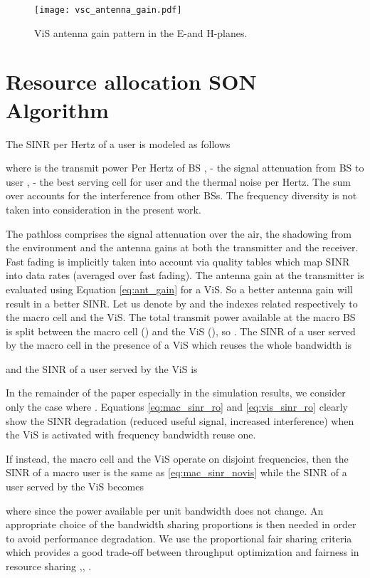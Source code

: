 \documentclass[conference]{IEEEtran}
\begin{document}
\begin{figure}[!ht]
\centering
\texttt{[image: vsc\_antenna\_gain.pdf]}
\caption{\ac{ViS} antenna gain pattern in the E-and H-planes.}
\label{fig:ant_gain}
\end{figure}


\section{Resource allocation SON Algorithm} \label{sec:son_algo}
	The \ac{SINR} per Hertz of a user  is modeled as follows
	
	where  is the transmit power Per Hertz of \ac{BS} ,  - the signal attenuation from \ac{BS}  to user ,  - the best serving cell for user  and  the thermal noise per Hertz. The sum over  accounts for the interference from other \acp{BS}. The frequency diversity is not taken into consideration in the present work.

	The pathloss  comprises the signal attenuation over the air, the shadowing from the environment and the antenna gains at both the transmitter and the receiver. Fast fading is implicitly taken into account via quality tables which map \ac{SINR} into data rates (averaged over fast fading). The antenna gain at the transmitter is evaluated using Equation \eqref{eq:ant_gain} for a \ac{ViS}. So a better antenna gain will result in a better \ac{SINR}. Let us denote by  and  the indexes related respectively to the macro cell and the \ac{ViS}. The total transmit power available at the macro \ac{BS}  is split between the macro cell () and the \ac{ViS} (), so . The \ac{SINR} of a user served by the macro cell in the presence of a \ac{ViS} which reuses the whole bandwidth is
	
	and the \ac{SINR} of a user served by the \ac{ViS} is
	

	In the remainder of the paper especially in the simulation results, we consider only the case where . Equations \eqref{eq:mac_sinr_ro} and \eqref{eq:vis_sinr_ro} clearly show the \ac{SINR} degradation (reduced useful signal, increased interference) when the \ac{ViS} is activated with frequency bandwidth reuse one.

	If instead, the macro cell and the \ac{ViS} operate on disjoint frequencies, then the \ac{SINR} of a macro user is the same as \eqref{eq:mac_sinr_novis} while the \ac{SINR} of a user served by the \ac{ViS} becomes
	
	where  since the power available per unit bandwidth does not change. An appropriate choice of the bandwidth sharing proportions is then needed in order to avoid performance degradation. We use the proportional fair sharing criteria which provides a good trade-off between throughput optimization and fairness in resource sharing \cite{bonald_queueinganalysismax_2006},\cite{kushner_convergenceproportionalfair_2004}, \cite{tall_selforganizingstrategies_2014}.
\end{document}
